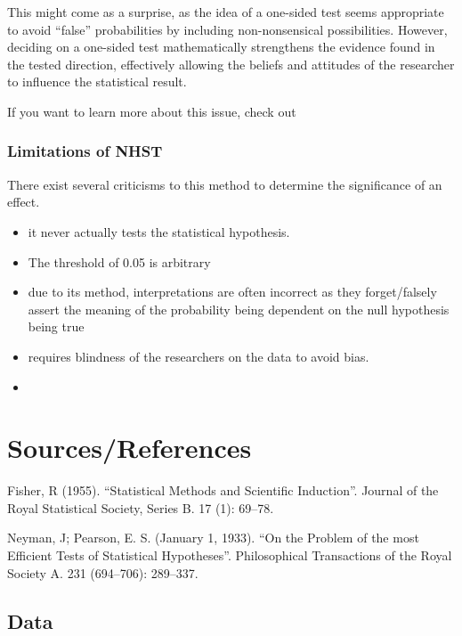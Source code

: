 \documentclass[
]{article}
\providecommand{\tightlist}{%
  \setlength{\itemsep}{0pt}\setlength{\parskip}{0pt}}
\begin{document}
This might come as a surprise, as the idea of a one-sided test seems
appropriate to avoid ``false'' probabilities by including
non-nonsensical possibilities. However, deciding on a one-sided test
mathematically strengthens the evidence found in the tested direction,
effectively allowing the beliefs and attitudes of the researcher to
influence the statistical result.

If you want to learn more about this issue, check out

\hypertarget{limitations-of-nhst}{%
\subsubsection{Limitations of NHST}\label{limitations-of-nhst}}

There exist several criticisms to this method to determine the
significance of an effect.

\begin{itemize}
\tightlist
\item
  it never actually tests the statistical hypothesis.
\item
  The threshold of 0.05 is arbitrary
\item
  due to its method, interpretations are often incorrect as they
  forget/falsely assert the meaning of the probability being dependent
  on the null hypothesis being true
\item
  requires blindness of the researchers on the data to avoid bias.
\item
\end{itemize}

\hypertarget{sourcesreferences}{%
\section{Sources/References}\label{sourcesreferences}}

Fisher, R (1955). ``Statistical Methods and Scientific Induction''.
Journal of the Royal Statistical Society, Series B. 17 (1): 69--78.

Neyman, J; Pearson, E. S. (January 1, 1933). ``On the Problem of the
most Efficient Tests of Statistical Hypotheses''. Philosophical
Transactions of the Royal Society A. 231 (694--706): 289--337.

\hypertarget{data}{%
\subsection{Data}\label{data}}
\end{document}
